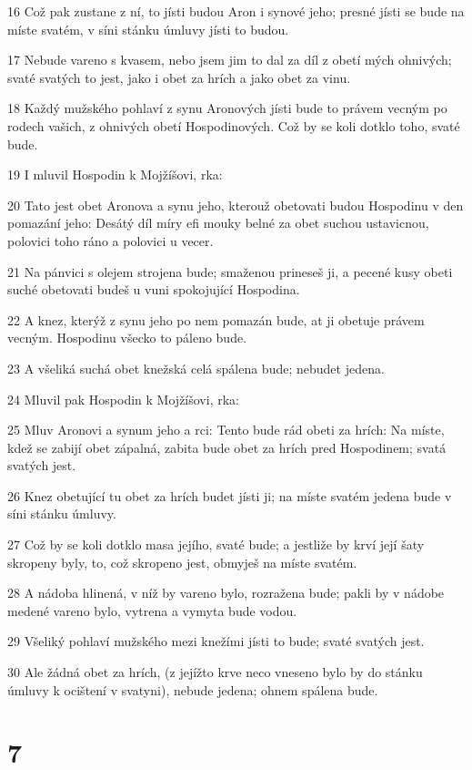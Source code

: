 \par 16 Což pak zustane z ní, to jísti budou Aron i synové jeho; presné jísti se bude na míste svatém, v síni stánku úmluvy jísti to budou.
\par 17 Nebude vareno s kvasem, nebo jsem jim to dal za díl z obetí mých ohnivých; svaté svatých to jest, jako i obet za hrích a jako obet za vinu.
\par 18 Každý mužského pohlaví z synu Aronových jísti bude to právem vecným po rodech vašich, z ohnivých obetí Hospodinových. Což by se koli dotklo toho, svaté bude.
\par 19 I mluvil Hospodin k Mojžíšovi, rka:
\par 20 Tato jest obet Aronova a synu jeho, kterouž obetovati budou Hospodinu v den pomazání jeho: Desátý díl míry efi mouky belné za obet suchou ustavicnou, polovici toho ráno a polovici u vecer.
\par 21 Na pánvici s olejem strojena bude; smaženou prineseš ji, a pecené kusy obeti suché obetovati budeš u vuni spokojující Hospodina.
\par 22 A knez, kterýž z synu jeho po nem pomazán bude, at ji obetuje právem vecným. Hospodinu všecko to páleno bude.
\par 23 A všeliká suchá obet knežská celá spálena bude; nebudet jedena.
\par 24 Mluvil pak Hospodin k Mojžíšovi, rka:
\par 25 Mluv Aronovi a synum jeho a rci: Tento bude rád obeti za hrích: Na míste, kdež se zabijí obet zápalná, zabita bude obet za hrích pred Hospodinem; svatá svatých jest.
\par 26 Knez obetující tu obet za hrích budet jísti ji; na míste svatém jedena bude v síni stánku úmluvy.
\par 27 Což by se koli dotklo masa jejího, svaté bude; a jestliže by krví její šaty skropeny byly, to, což skropeno jest, obmyješ na míste svatém.
\par 28 A nádoba hlinená, v níž by vareno bylo, rozražena bude; pakli by v nádobe medené vareno bylo, vytrena a vymyta bude vodou.
\par 29 Všeliký pohlaví mužského mezi knežími jísti to bude; svaté svatých jest.
\par 30 Ale žádná obet za hrích, (z jejížto krve neco vneseno bylo by do stánku úmluvy k ocištení v svatyni), nebude jedena; ohnem spálena bude.

\chapter{7}

